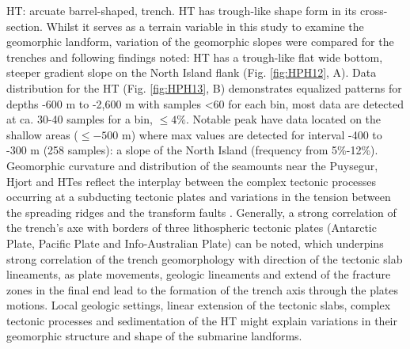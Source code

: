 \documentclass[11pt,a4paper]{report}
\begin{document}
{\ac{HT}: arcuate barrel-shaped, trench. \ac{HT} has trough-like shape form in its cross-section. Whilst it serves as a terrain variable in this study to examine the geomorphic landform, variation of the geomorphic slopes were compared for the trenches and following findings noted: \ac{HT} has a trough-like flat wide bottom, steeper gradient slope on the North Island flank (Fig. \ref{fig:HPH12}, A). Data distribution for the \ac{HT} (Fig. \ref{fig:HPH13}, B) \cite{Lemenkova202031} demonstrates equalized patterns for depths -600 m to -2,600 m with samples <60 for each bin, most data are detected at ca. 30-40 samples for a bin, $\leq 4\%$. Notable peak have data located on the shallow areas ($\leq-500$ m) where max values are detected for interval -400 to -300 m (258 samples): a slope of the North Island (frequency from 5\%-12\%). Geomorphic curvature and distribution of the seamounts near the Puysegur, Hjort and \ac{HT}es reflect the interplay between the complex tectonic processes occurring at a subducting tectonic plates and variations in the tension between the spreading ridges and the transform faults \cite{Lemenkova202013}. Generally, a strong correlation of the trench’s axe with borders of three lithospheric tectonic plates (Antarctic Plate, Pacific Plate and Info-Australian Plate) can be noted, which underpins strong correlation of the trench geomorphology with direction of the tectonic slab lineaments, as plate movements, geologic lineaments and extend of the fracture zones in the final end lead to the formation of the trench axis through the plates motions. Local geologic settings, linear extension of the tectonic slabs, complex tectonic processes and sedimentation of the \ac{HT} might explain variations in their geomorphic structure and shape of the submarine landforms. 

}
\end{document}
